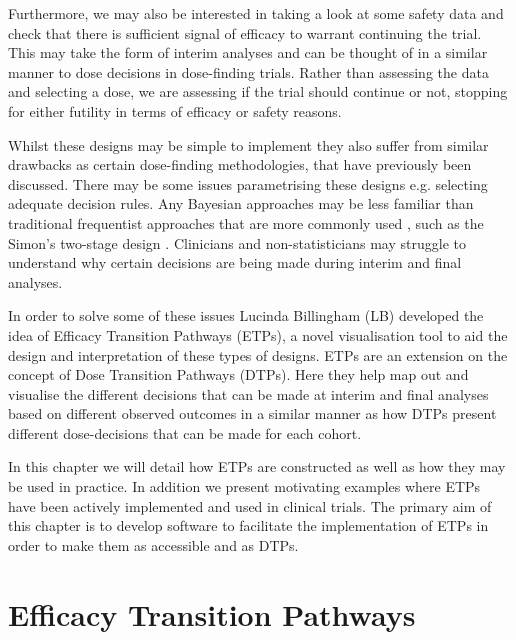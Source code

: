 Furthermore, we may also be interested in taking a look at some safety data and check that there is sufficient signal of efficacy to warrant continuing the trial. This may take the form of interim analyses and can be thought of in a similar manner to dose decisions in dose-finding trials. Rather than assessing the data and selecting a dose, we are assessing if the trial should continue or not, stopping for either futility in terms of efficacy or safety reasons.  

Whilst these designs may be simple to implement they also suffer from similar drawbacks as certain dose-finding methodologies, that have previously been discussed. There may be some issues parametrising these designs e.g. selecting adequate decision rules. Any Bayesian approaches may be less familiar than traditional frequentist approaches that are more commonly used \cite{ivanovaNineyearChangeStatistical2016}, such as the Simon's two-stage design \cite{simonOptimalTwostageDesigns1989}. Clinicians and non-statisticians may struggle to understand why certain decisions are being made during interim and final analyses. 

In order to solve some of these issues Lucinda Billingham (LB) developed the idea of Efficacy Transition Pathways (ETPs), a novel visualisation tool to aid the design and interpretation of these types of designs. ETPs are an extension on the concept of Dose Transition Pathways (DTPs). Here they help map out and visualise the different decisions that can be made at interim and final analyses based on different observed outcomes in a similar manner as how DTPs present different dose-decisions that can be made for each cohort. 

In this chapter we will detail how ETPs are constructed as well as how they may be used in practice. In addition we present motivating examples where ETPs have been actively implemented and used in clinical trials. The primary aim of this chapter is to develop software to facilitate the implementation of ETPs in order to make them as accessible and as DTPs. 


\section{Efficacy Transition Pathways}
\label{etp:ETPs}

